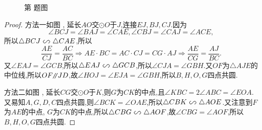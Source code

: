 \documentclass[UTF8,no-math,12pt,openany,table,dvipsnames,svgnames]{book}
\newcommand\pxx{%
		\mathord{\text{\tikz[baseline] \draw[semithick] (0em,-0.3ex) -- ++(.4em,1.8ex) (.25em,-0.3ex) -- ++ (.4em,1.8ex);}%
	}}
\newcommand*\xs{%
		\mathrel{\text{%
				\tikz \draw[baseline,semithick] (-.25em,1.15ex) .. controls (-.55em,1.15ex) and (-.51em,.23ex) .. (-.275em,.23ex) .. controls (0,.23ex) and (0,1.15ex) .. (.275em,1.15ex) .. controls (.51em,1.15ex) and (.55em,.23ex) .. (.25em,.23ex);%
	}}}
\begin{document}
\begin{enumerate}
\begin{figure}[!ht]
{\begin{tikzpicture}[semithick,inner sep=1.5pt]
\end{tikzpicture}
}
\caption{第 \thefigure 题图}
\end{figure}
\begin{proof}
{\kaishu 方法一\quad}如图 , 延长$AO$交$\odot O$于$J$,连接$EJ,BJ,CJ$.因为
\[\angle BCJ=\angle BAJ=\angle CAE,\angle CBJ=\angle CAJ=\angle ACE,\]
所以$\triangle BCJ\xs\triangle CAE$,所以
\[\frac{AE}{CJ}=\frac{AC}{BC}\Rightarrow AE\cdot BC=AC\cdot CJ=CG\cdot AJ\Rightarrow
\frac{AE}{CG}=\frac{AJ}{BC}.\]
又$\angle EAJ=\angle GCB$,所以$\triangle EAJ\xs\triangle GCB$,所以$\angle CJA=\angle GBH$.又$OF$为$\triangle AJE$的中位线,所以$OF\pxx JD$,故$\angle HOJ=\angle EJA=\angle GBH$,所以$B,H,O,G$四点共圆.

{\kaishu 方法二\quad}如图 , 延长$CG$交$\odot O$于$K$,则$G$为$CK$的中点,且$\angle KBC=2\angle ABC=\angle EOA$.又易知$A,G,D,C$四点共圆,则$\angle BCK=\angle OAE$,所以$\triangle CBK\xs\triangle AOE$.又注意到$F$为$AE$的中点, $G$为$CK$的中点,所以$\triangle CBG\xs\triangle AOF$,故$\angle CBG=\angle AOF$,所以$B,H,O,G$四点共圆.


\end{proof}
\end{enumerate}
\end{document}
